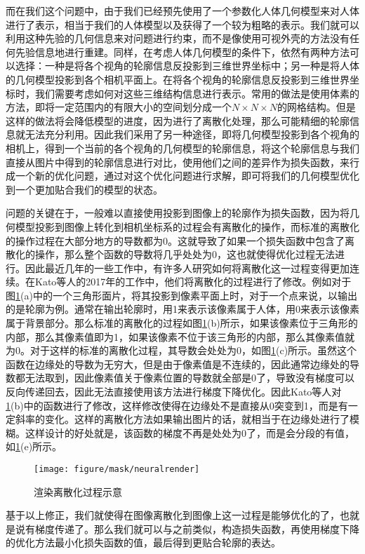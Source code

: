 而在我们这个问题中，由于我们已经预先使用了一个参数化人体几何模型来对人体进行了表示，相当于我们的人体模型以及获得了一个较为粗略的表示。我们就可以利用这种先验的几何信息来对问题进行约束，而不是像使用可视外壳的方法没有任何先验信息地进行重建。同样，在考虑人体几何模型的条件下，依然有两种方法可以选择：一种是将各个视角的轮廓信息反投影到三维世界坐标中；另一种是将人体的几何模型投影到各个相机平面上。在将各个视角的轮廓信息反投影到三维世界坐标时，我们需要考虑如何对这些三维结构信息进行表示。常用的做法是使用体素的方法，即将一定范围内的有限大小的空间划分成一个\(N\times N \times N\)的网格结构。但是这样的做法将会降低模型的进度，因为进行了离散化处理，那么可能精细的轮廓信息就无法充分利用。因此我们采用了另一种途径，即将几何模型投影到各个视角的相机上，得到一个当前的各个视角的几何模型的轮廓信息，将这个轮廓信息与我们直接从图片中得到的轮廓信息进行对比，使用他们之间的差异作为损失函数，来行成一个新的优化问题，通过对这个优化问题进行求解，即可将我们的几何模型优化到一个更加贴合我们的模型的状态。

问题的关键在于，一般难以直接使用投影到图像上的轮廓作为损失函数，因为将几何模型投影到图像上转化到相机坐标系的过程会有离散化的操作，而标准的离散化的操作过程在大部分地方的导数都为0。这就导致了如果一个损失函数中包含了离散化的操作，那么整个函数的导数将几乎处处为0，这也就使得优化过程无法进行。因此最近几年的一些工作中，有许多人研究如何将离散化这一过程变得更加连续。在Kato\cite{neuralrender}等人的2017年的工作中，他们将离散化的过程进行了修改。例如对于图\ref{fig:nmr}(a)中的一个三角形面片，将其投影到像素平面上时，对于一个点来说，以输出的是轮廓为例。通常在输出轮廓时，用1来表示该像素属于人体，用0来表示该像素属于背景部分。那么标准的离散化的过程如图\ref{fig:nmr}(b)所示，如果该像素位于三角形的内部，那么其像素值即为1，如果该像素不位于该三角形的内部，那么其像素值就为0。对于这样的标准的离散化过程，其导数会处处为0，如图\ref{fig:nmr}(c)所示。虽然这个函数在边缘处的导数为无穷大，但是由于像素值是不连续的，因此通常边缘处的导数都无法取到，因此像素值关于像素位置的导数就全部是0了，导致没有梯度可以反向传递回去，因此无法直接使用该方法进行梯度下降优化。因此Kato\cite{neuralrender}等人对\ref{fig:nmr}(b)中的函数进行了修改，这样修改使得在边缘处不是直接从0突变到1，而是有一定斜率的变化。这样的离散化方法如果输出图片的话，就相当于在边缘处进行了模糊。这样设计的好处就是，该函数的梯度不再是处处为0了，而是会分段的有值，如\ref{fig:nmr}(e)所示。 
\begin{figure}[htbp]
    \centering
    \texttt{[image: figure/mask/neuralrender]}
    \caption{\label{fig:nmr} 渲染离散化过程示意}
\end{figure}
基于以上修正，我们就使得在图像离散化到图像上这一过程是能够优化的了，也就是说有梯度传递了。那么我们就可以与之前类似，构造损失函数，再使用梯度下降的优化方法最小化损失函数的值，最后得到更贴合轮廓的表达。

